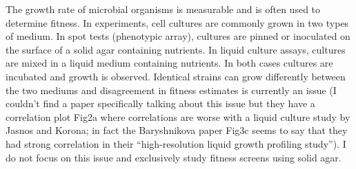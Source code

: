 The growth rate of microbial organisms is measurable and is often used
to determine fitness. In experiments, cell cultures are commonly grown
in two types of medium. In spot tests (phenotypic array), cultures are
pinned or inoculated on the surface of a solid agar containing
nutrients. In liquid culture assays, cultures are mixed in a liquid
medium containing nutrients. In both cases cultures are incubated and
growth is observed. Identical strains can grow differently between the
two mediums and disagreement in fitness estimates is currently an
issue \citet{Baryshnikova2010} (I couldn't find a paper specifically
talking about this issue but they have a correlation plot Fig2a where
correlations are worse with a liquid culture study by Jasnos and
Korona; in fact the Baryshnikova paper Fig3c seems to say that they
had strong correlation in their ``high-resolution liquid growth
profiling study''). I do not focus on this issue and exclusively study
fitness screens using solid agar.






